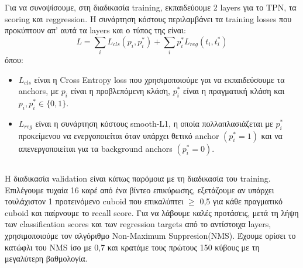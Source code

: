 Για να συνοψίσουμε, στη διαδικασία \en training\gr, εκπαιδεύουμε 2 \en layers \gr για το \en TPN, \gr τα \en scoring \gr και \en reggression\gr. Η συνάρτηση κόστους περιλαμβάνει τα
\en training losses \gr που προκύπτουν απ' αυτά τα \en layers \gr και ο τύπος της είναι: \en
\[ L  =  \sum_iL_{cls}(p_i, p_i^*) + \sum_ip_i^*L_{reg}(t_i,t_i^*) \]
\gr όπου:
\begin{itemize}
\item \en $L_{cls} $ \gr είναι η \en Cross Entropy loss \gr που χρησιμοποιούμε γαι να εκπαιδεύσουμε τα \en anchors\gr, με \en $p_i$  \gr είναι η προβλεπόμενη κλάση, \en $p_i^*$ \gr
  είναι η πραγματική κλάση και \en   $p_i, p_i^* \in \{0,1\}$. \gr
\item \en $L_{reg} $ \gr είναι η συνάρτηση κόστους \en smooth-L1\gr, η οποία πολλαπλασιάζεται με \en $p_i^*$  \gr προκείμενου να ενεργοποιείται όταν υπάρχει θετικό \en anchor  $(p_i^* = 1)$ \gr
  και να απενεργοποιείται για τα \en background anchors $(p_i^* = 0)$.
\end{itemize}
\gr
\subsection{}

Η διαδικασία \en validation \gr είναι κάπως παρόμοια με τη διαδικασία του \en training\gr.
Επιλέγουμε τυχαία 16 καρέ από ένα βίντεο επικύρωσης, εξετάζουμε αν υπάρχει τουλάχιστον 1 προτεινόμενο \en cuboid \gr
που επικαλύπτει $\ge$ 0,5 για κάθε πραγματικό \en cuboid \gr και παίρνουμε το \en recall score\gr.
Για να λάβουμε καλές προτάσεις, μετά τη λήψη των \en classification scores \gr και των \en regression targets \gr από το
αντίστοιχα \en layers\gr, χρησιμοποιούμε τον αλγόριθμο \en Non-Maximum Suppresion(NMS)\gr.
Έχουμε ορίσει το κατώφλι του \en NMS \gr ίσο με 0,7 και κρατάμε τους πρώτους 150 κύβους με τη μεγαλύτερη βαθμολογία.

